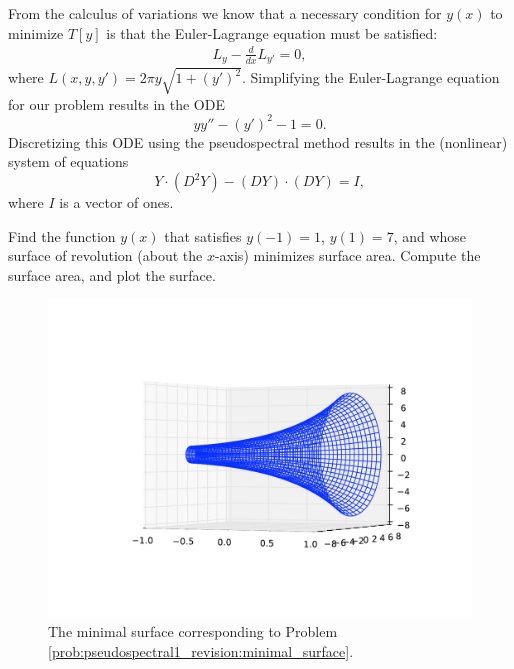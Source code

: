 From the calculus of variations we know that a necessary condition for $y(x)$ to minimize $T[y]$ is that the Euler-Lagrange equation must be satisfied:
\begin{align*}
	L_y - \frac{d}{dx}L_{y'} = 0,
\end{align*}
where $L(x,y,y') = 2 \pi y \sqrt{1 + (y')^2}$.
Simplifying the Euler-Lagrange equation for our problem results in the ODE
\[y y'' - (y')^2 -1 = 0.\]
Discretizing this ODE using the pseudospectral method results in the (nonlinear) system of equations
\[
Y \cdot (D^2 Y) - (DY) \cdot (DY) = I,
\]
where $I$ is a vector of ones.

\begin{problem}
Find the function $y(x)$ that satisfies $y(-1) = 1$, $y(1) = 7$, and whose surface of revolution (about the $x$-axis) minimizes surface area.
Compute the surface area, and plot the surface. \label{prob:pseudospectral1_revision:minimal_surface}
\end{problem}

\begin{figure}
\centering
\includegraphics[width=\textwidth]{minimal_surface.pdf}
\caption{The minimal surface corresponding to Problem  \ref{prob:pseudospectral1_revision:minimal_surface}.}
\label{fig:pseudospectral1_revision:minimal_surface}
\end{figure}








